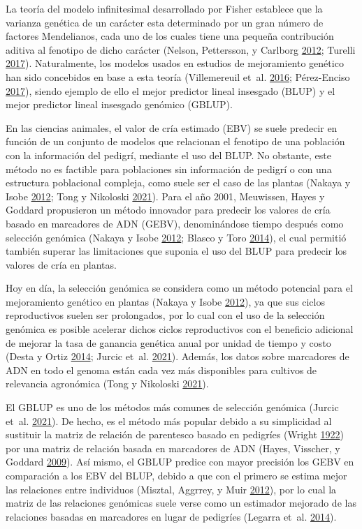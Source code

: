 \documentclass[11pt,spanish,a4paper,oneside,]{book} %
\begin{document}
La teoría del modelo infinitesimal desarrollado por Fisher establece que la varianza genética de un carácter esta determinado por un gran número de factores Mendelianos, cada uno de los cuales tiene una pequeña contribución aditiva al fenotipo de dicho carácter (Nelson, Pettersson, y Carlborg \protect\hyperlink{ref-cite:2}{2012}; Turelli \protect\hyperlink{ref-cite:9}{2017}). Naturalmente, los modelos usados en estudios de mejoramiento genético han sido concebidos en base a esta teoría (Villemereuil et~al. \protect\hyperlink{ref-cite:4}{2016}; Pérez-Enciso \protect\hyperlink{ref-cite:5}{2017}), siendo ejemplo de ello el mejor predictor lineal insesgado (BLUP) y el mejor predictor lineal insesgado genómico (GBLUP).

En las ciencias animales, el valor de cría estimado (EBV) se suele predecir en función de un conjunto de modelos que relacionan el fenotipo de una población con la información del pedigrí, mediante el uso del BLUP. No obstante, este método no es factible para poblaciones sin información de pedigrí o con una estructura poblacional compleja, como suele ser el caso de las plantas (Nakaya y Isobe \protect\hyperlink{ref-cite:6}{2012}; Tong y Nikoloski \protect\hyperlink{ref-cite:7}{2021}). Para el año 2001, Meuwissen, Hayes y Goddard propusieron un método innovador para predecir los valores de cría basado en marcadores de ADN (GEBV), denominándose tiempo después como selección genómica (Nakaya y Isobe \protect\hyperlink{ref-cite:6}{2012}; Blasco y Toro \protect\hyperlink{ref-cite:3}{2014}), el cual permitió también superar las limitaciones que suponia el uso del BLUP para predecir los valores de cría en plantas.

Hoy en día, la selección genómica se considera como un método potencial para el mejoramiento genético en plantas (Nakaya y Isobe \protect\hyperlink{ref-cite:6}{2012}), ya que sus ciclos reproductivos suelen ser prolongados, por lo cual con el uso de la selección genómica es posible acelerar dichos ciclos reproductivos con el beneficio adicional de mejorar la tasa de ganancia genética anual por unidad de tiempo y costo (Desta y Ortiz \protect\hyperlink{ref-cite:10}{2014}; Jurcic et~al. \protect\hyperlink{ref-cite:11}{2021}). Además, los datos sobre marcadores de ADN en todo el genoma están cada vez más disponibles para cultivos de relevancia agronómica (Tong y Nikoloski \protect\hyperlink{ref-cite:7}{2021}).

El GBLUP es uno de los métodos más comunes de selección genómica (Jurcic et~al. \protect\hyperlink{ref-cite:11}{2021}). De hecho, es el método más popular debido a su simplicidad al sustituir la matriz de relación de parentesco basado en pedigríes (Wright \protect\hyperlink{ref-cite:12}{1922}) por una matriz de relación basada en marcadores de ADN (Hayes, Visscher, y Goddard \protect\hyperlink{ref-cite:13}{2009}). Así mismo, el GBLUP predice con mayor precisión los GEBV en comparación a los EBV del BLUP, debido a que con el primero se estima mejor las relaciones entre individuos (Misztal, Aggrrey, y Muir \protect\hyperlink{ref-cite:14}{2012}), por lo cual la matriz de las relaciones genómicas suele verse como un estimador mejorado de las relaciones basadas en marcadores en lugar de pedigríes (Legarra et~al. \protect\hyperlink{ref-cite:15}{2014}).
\end{document}
